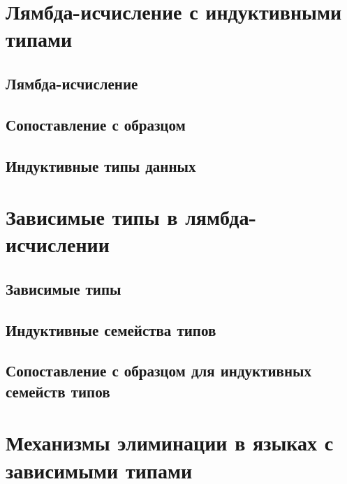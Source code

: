 \documentclass[14pt, a4paper]{extarticle}
\begin{document}


\newpage
\setcounter{page}{2}
\tableofcontents

\newpage
\section{Лямбда-исчисление с индуктивными типами}

\subsection{Лямбда-исчисление}


\subsection{Сопоставление с образцом}


\subsection{Индуктивные типы данных}


\newpage
\section{Зависимые типы в лямбда-исчислении}

\subsection{Зависимые типы}


\subsection{Индуктивные семейства типов}


\subsection{Сопоставление с образцом для индуктивных семейств типов}


\newpage
\section{Механизмы элиминации в языках с зависимыми типами}
\end{document}
